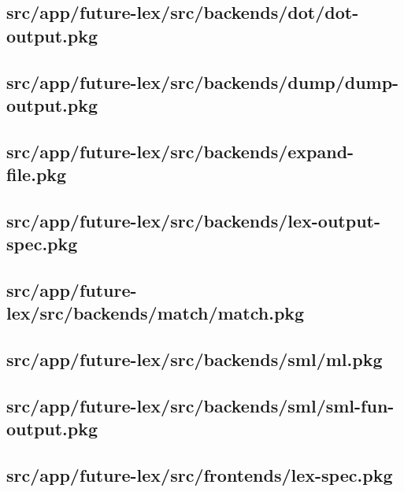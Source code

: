 \subsection{src/app/future-lex/src/backends/dot/dot-output.pkg}


\subsection{src/app/future-lex/src/backends/dump/dump-output.pkg}


\subsection{src/app/future-lex/src/backends/expand-file.pkg}


\subsection{src/app/future-lex/src/backends/lex-output-spec.pkg}


\subsection{src/app/future-lex/src/backends/match/match.pkg}


\subsection{src/app/future-lex/src/backends/sml/ml.pkg}


\subsection{src/app/future-lex/src/backends/sml/sml-fun-output.pkg}


\subsection{src/app/future-lex/src/frontends/lex-spec.pkg}


